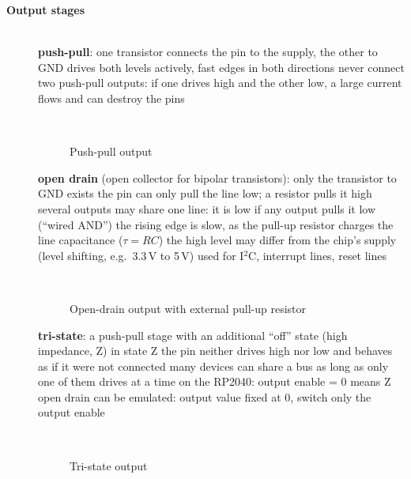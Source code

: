 \begin{description}
\item[{\rot\bf Output stages}]~\\[-\lblskip]
\bi
	\ite \textbf{push-pull}: one transistor connects the pin to the supply, the other to GND
	\bi
		\ite drives both levels actively, fast edges in both directions
		\ite never connect two push-pull outputs: if one drives high and the other low, a large current flows and can destroy the pins
	\ei
\ei
\begin{figure}[!hbtp]
     \begin{center}
	  \\
	  \caption{Push-pull output}
     \end{center}
\end{figure}
\os{\newpage}

\bi
	\ite \textbf{open drain} (open collector for bipolar transistors): only the transistor to GND exists
	\bi
		\ite the pin can only pull the line low; a resistor pulls it high
		\ite several outputs may share one line: it is low if any output pulls it low (``wired AND'')
		\ite the rising edge is slow, as the pull-up resistor charges the line capacitance ($\tau = RC$)
		\ite the high level may differ from the chip's supply (level shifting, e.g.\ 3.3\,V to 5\,V)
		\ite used for I$^2$C, interrupt lines, reset lines
	\ei
\ei
\begin{figure}[!hbtp]
     \begin{center}
	  \\
	  \caption{Open-drain output with external pull-up resistor}
     \end{center}
\end{figure}
\os{\newpage}

\bi
	\ite \textbf{tri-state}: a push-pull stage with an additional ``off'' state (high impedance, Z)
	\bi
		\ite in state Z the pin neither drives high nor low and behaves as if it were not connected
		\ite many devices can share a bus as long as only one of them drives at a time
		\ite on the RP2040: output enable = 0 means Z
		\ite open drain can be emulated: output value fixed at 0, switch only the output enable
	\ei
\ei
\begin{figure}[!hbtp]
     \begin{center}
	  \\
	  \caption{Tri-state output}
     \end{center}
\end{figure}
\os{\newpage}


\end{description}

